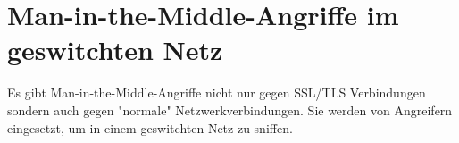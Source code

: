\section{Man-in-the-Middle-Angriffe im geswitchten Netz}
\label{sec:geswitchtes_netz}
Es gibt Man-in-the-Middle-Angriffe nicht nur gegen SSL/TLS
Verbindungen sondern auch gegen "normale" Netzwerkverbindungen.
Sie werden von Angreifern eingesetzt, um in einem geswitchten Netz
zu sniffen.